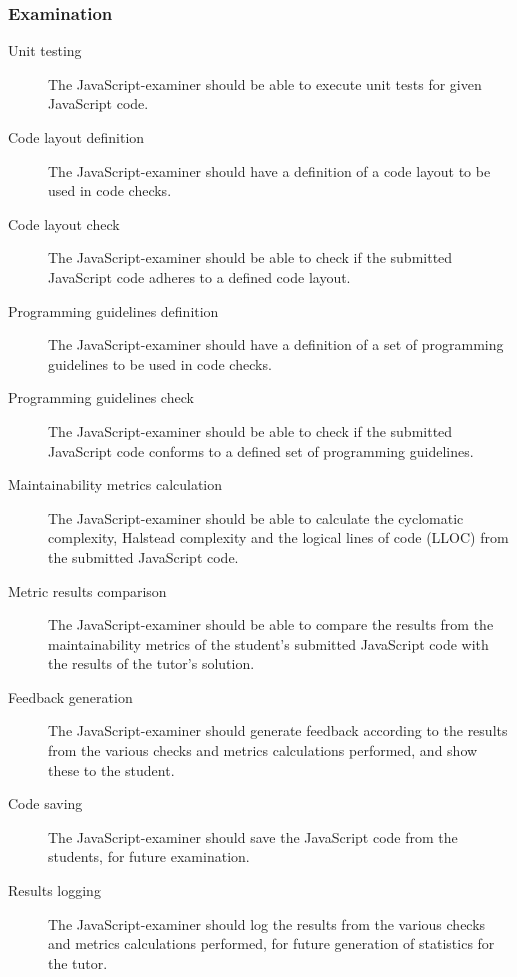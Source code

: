 \documentclass{article}
\begin{document}
\subsubsection{Examination}
\begin{description}
  \item[Unit testing] The JavaScript-examiner should be able to execute unit 
    tests for given JavaScript code.
  \item[Code layout definition] The JavaScript-examiner should have a
    definition of a code layout to be used in code checks.
  \item[Code layout check] The JavaScript-examiner should be able to check if 
    the submitted JavaScript code adheres to a defined code layout.
  \item[Programming guidelines definition] The JavaScript-examiner should have
    a definition of a set of programming guidelines to be used in code checks.
  \item[Programming guidelines check] The JavaScript-examiner should be able to
    check if the submitted JavaScript code conforms to a defined set of
    programming guidelines.
  \item[Maintainability metrics calculation] The JavaScript-examiner should be 
    able to calculate the cyclomatic complexity, Halstead complexity and the 
    logical lines of code (LLOC) from the submitted JavaScript code.
  \item[Metric results comparison] The JavaScript-examiner should be able to
    compare the results from the maintainability metrics of the student's
    submitted JavaScript code with the results of the tutor's solution.
  \item[Feedback generation] The JavaScript-examiner should generate feedback
    according to the results from the various checks and metrics calculations
    performed, and show these to the student.
  \item[Code saving] The JavaScript-examiner should save the JavaScript code
    from the students, for future examination.
  \item[Results logging] The JavaScript-examiner should log the results from
    the various checks and metrics calculations performed, for future
    generation of statistics for the tutor.
\end{description}
\end{document}
